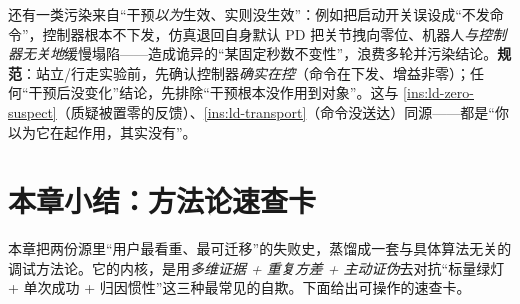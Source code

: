 \begin{insight}\label{ins:ld-intervention}
还有一类污染来自“干预\emph{以为}生效、实则没生效”：例如把启动开关误设成“不发命令”，控制器根本不下发，仿真退回自身默认 PD 把关节拽向零位、机器人\emph{与控制器无关地}缓慢塌陷——造成诡异的“某固定秒数不变性”，浪费多轮并污染结论。\textbf{规范}：站立/行走实验前，先确认控制器\emph{确实在控}（命令在下发、增益非零）；任何“干预后没变化”结论，先排除“干预根本没作用到对象”。这与 \cref{ins:ld-zero-suspect}（质疑被置零的反馈）、\cref{ins:ld-transport}（命令没送达）同源——都是“你以为它在起作用，其实没有”。
\end{insight}

\section{本章小结：方法论速查卡}
\label{sec:ld-checklist}

本章把两份源里“用户最看重、最可迁移”的失败史，蒸馏成一套与具体算法无关的调试方法论。它的内核，是用\emph{多维证据 + 重复方差 + 主动证伪}去对抗“标量绿灯 + 单次成功 + 归因惯性”这三种最常见的自欺。下面给出可操作的速查卡。

